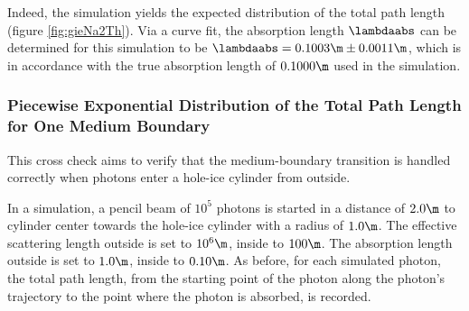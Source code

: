 
Indeed, the simulation yields the expected distribution of the total path length (figure \ref{fig:gieNa2Th}). Via a curve fit, the absorption length $\lambdaabs$ can be determined for this simulation to be $\lambdaabs = 0.1003\m \pm 0.0011\m$, which is in accordance with the true absorption length of $0.1000\m$ used in the simulation.

\FloatBarrier\newpage
\subsubsection{Piecewise Exponential Distribution of the Total Path Length for One Medium Boundary}


This cross check aims to verify that the medium-boundary transition is handled correctly when photons enter a hole-ice cylinder from outside.


%

In a simulation, a pencil beam of $10^5$ photons is started in a distance of $2.0\m$ to cylinder center towards the hole-ice cylinder with a radius of $1.0\m$. The effective scattering length outside is set to $10^6\m$, inside to $100\m$. The absorption length outside is set to $1.0\m$, inside to $0.10\m$.
As before, for each simulated photon, the total path length, from the starting point of the photon along the photon's trajectory to the point where the photon is absorbed, is recorded.


